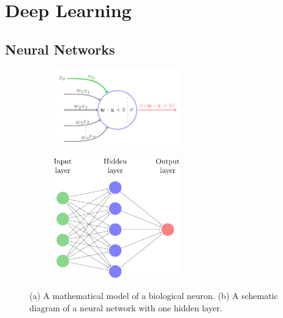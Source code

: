 \documentclass[fleqn,usenatbib]{mnras}
\begin{document}
\section{Deep Learning}
  \label{sec:deep_learning}

\subsection{Neural Networks}

\begin{figure}
  \centering
  \begin{subfigure}[]{0.49\linewidth}
    \centering
    \includegraphics[width=0.6\textwidth]{figures/neuron.pdf}
    \caption{}
    \label{fig:neuron_a}
  \end{subfigure}
  \begin{subfigure}[]{0.49\linewidth}
    \centering
    \includegraphics[width=0.6\textwidth]{figures/network.pdf}
    \caption{}
    \label{fig:neuron_b}
  \end{subfigure}
  \caption{
    (a) A mathematical model of a biological neuron.
    (b) A schematic diagram of a neural network with one hidden layer.
    }
\end{figure}
\end{document}
